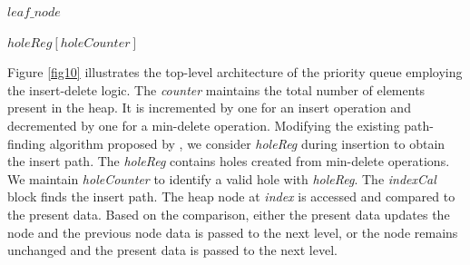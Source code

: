 \begin{algorithm}
\caption{$findPath$($counter$, $holeCounter$)}
\label{algo2}
\begin{algorithmic}[1]
    \ELSE
    \ENDIF
\end{algorithmic}
\end{algorithm}

\begin{algorithm}
\caption{$findNode(counter)$}
\label{algo3}
\begin{algorithmic}[1]
    \ENDFOR
    \RETURN $leaf\_node$
\end{algorithmic}
\end{algorithm}

\begin{algorithm}
\caption{$holeCal(holeCounter)$}
\label{algo4}
\begin{algorithmic}[1]
    \RETURN $holeReg[holeCounter]$
\end{algorithmic}
\end{algorithm}

\begin{algorithm}
\caption{$indexCal$($insert\_path$, $level$, $index$)}
\label{algo5}
\begin{algorithmic}[1]
    \ELSE
    \ENDIF
\end{algorithmic}
\end{algorithm}

Figure \ref{fig10} illustrates the top-level architecture of the priority queue employing the insert-delete logic.
The {\it counter} maintains the total number of elements present in the heap.
It is incremented by one for an insert operation and decremented by one for a min-delete operation.
Modifying the existing path-finding algorithm proposed by \cite{pq6}, we consider {\it holeReg} during insertion to obtain the insert path.
The {\it holeReg} contains holes created from min-delete operations.
We maintain {\it holeCounter} to identify a valid hole with {\it holeReg}.
The {\it indexCal} block finds the insert path.
The heap node at {\it index} is accessed and compared to the present data.
Based on the comparison, either the present data updates the node and the previous node data is passed to the next level, or the node remains unchanged and the present data is passed to the next level.


